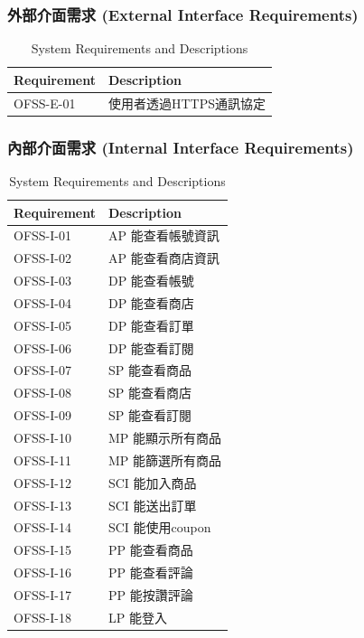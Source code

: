 \documentclass[a4paper, 12pt]{article}
\begin{document}
\subsubsection{外部介面需求 (External Interface Requirements)}
\begin{table}[h]
    \centering
    \renewcommand{\arraystretch}{1.35}
    \begin{tabular}{|p{3cm}|p{10cm}|}
        \hline
        \textbf{Requirement} & \textbf{Description} \\
        \hline
        OFSS-E-01 & 使用者透過HTTPS通訊協定 \\
        \hline
    \end{tabular}
    \caption{System Requirements and Descriptions}
    \label{tab:system-requirements}
\end{table}
\newpage
\subsubsection{內部介面需求 (Internal Interface Requirements)}
\begin{table}[h]
    \centering
    \renewcommand{\arraystretch}{1.35}
    \begin{tabular}{|p{3cm}|p{10cm}|}
        \hline
        \textbf{Requirement} & \textbf{Description} \\
        \hline
        OFSS-I-01 & AP 能查看帳號資訊 \\
        \hline
        OFSS-I-02 & AP 能查看商店資訊 \\
        \hline
        OFSS-I-03 & DP 能查看帳號 \\
        \hline
        OFSS-I-04 & DP 能查看商店 \\
        \hline
        OFSS-I-05 & DP 能查看訂單 \\
        \hline
        OFSS-I-06 & DP 能查看訂閱 \\
        \hline
        OFSS-I-07 & SP 能查看商品 \\
        \hline
        OFSS-I-08 & SP 能查看商店 \\
        \hline
        OFSS-I-09 & SP 能查看訂閱 \\
        \hline
        OFSS-I-10 & MP 能顯示所有商品 \\
        \hline
        OFSS-I-11 & MP 能篩選所有商品 \\
        \hline
        OFSS-I-12 & SCI 能加入商品 \\
        \hline
        OFSS-I-13 & SCI 能送出訂單 \\
        \hline
        OFSS-I-14 & SCI 能使用coupon \\
        \hline
        OFSS-I-15 & PP 能查看商品 \\
        \hline
        OFSS-I-16 & PP 能查看評論 \\
        \hline
        OFSS-I-17 & PP 能按讚評論 \\
        \hline
        OFSS-I-18 & LP 能登入 \\
        \hline
    \end{tabular}
    \caption{System Requirements and Descriptions}
    \label{tab:system-requirements}
\end{table}
\end{document}
